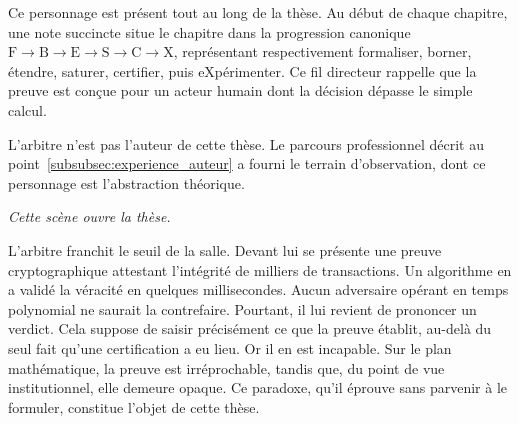 Ce personnage est pr\'esent tout au long de la th\`ese. Au d\'ebut de chaque
chapitre, une note succincte situe le chapitre dans la
progression canonique
$\mathrm{F}{\to}\mathrm{B}{\to}\mathrm{E}{\to}\mathrm{S}{\to}\mathrm{C}{\to}\mathrm{X}$,
repr\'esentant respectivement formaliser, borner, \'etendre, saturer,
certifier, puis eXp\'erimenter. Ce fil directeur rappelle que la
preuve est con\c{c}ue pour un acteur humain dont la d\'ecision d\'epasse le
simple calcul.

L'arbitre n'est pas l'auteur de cette thèse. Le parcours professionnel décrit au point~\ref{subsubsec:experience_auteur}
a fourni le terrain d'observation, dont ce personnage est l'abstraction théorique.

\medskip
\noindent\textit{Cette sc\`ene ouvre la th\`ese.}

\vspace{0.8cm}

\begin{boiteArbitre}
L'arbitre franchit le seuil de la salle. Devant lui se pr\'esente une preuve
cryptographique attestant l'int\'egrit\'e de milliers de transactions. Un
algorithme en a valid\'e la v\'eracit\'e en quelques millisecondes. Aucun
adversaire op\'erant en temps polynomial ne saurait la contrefaire. Pourtant,
il lui revient de prononcer un verdict. Cela suppose de saisir pr\'ecis\'ement ce
que la preuve \'etablit, au-del\`a du seul fait qu'une certification a eu
lieu. Or il en est incapable. Sur le plan
math\'ematique, la preuve est irr\'eprochable, tandis que, du point de vue
institutionnel, elle demeure opaque. Ce paradoxe, qu'il \'eprouve sans
parvenir \`a le formuler, constitue l'objet de cette th\`ese.
\end{boiteArbitre}